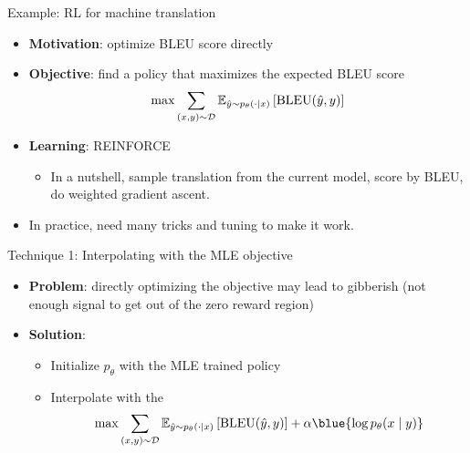 \documentclass[usenames,dvipsnames,notes,11pt,aspectratio=169,hyperref={colorlinks=true, linkcolor=blue}]{beamer}
\begin{document}
\begin{frame}{Example: RL for machine translation}{}
    \begin{itemize}
        \itemsep1em
        \item {\bf Motivation}: optimize BLEU score directly
        \item {\bf Objective}: find a policy that maximizes the expected BLEU score
            $$
            \max \sum_{(x,y)\sim \mathcal{D}}\mathbb{E}_{\hat{y}\sim p_\theta(\cdot\mid x)}\left[ \text{BLEU}(\hat{y},y) \right]
            $$
        \item {\bf Learning}: REINFORCE
            \begin{itemize}
                \item In a nutshell, sample translation from the current model, score by BLEU, do weighted gradient ascent.
            \end{itemize}
        \item In practice, need many tricks and tuning to make it work. 
    \end{itemize}
\end{frame}

\begin{frame}
    {Technique 1: Interpolating with the MLE objective}
    \begin{itemize}
        \itemsep1em
        \item {\bf Problem}: directly optimizing the objective may lead to gibberish (not enough signal to get out of the zero reward region)
            \pause
        \item {\bf Solution}:
            \begin{itemize}
                \item Initialize $p_\theta$ with the MLE trained policy
                \item Interpolate with the 
                    $$
                    \max \sum_{(x,y)\sim \sD}\BE_{\hat{y}\sim p_\theta(\cdot\mid x)}\pb{\text{BLEU}(\hat{y},y)}
                    + \alpha \blue{\log p_\theta(x\mid y)}
                    $$
            \end{itemize}
    \end{itemize}
\end{frame}
\end{document}

